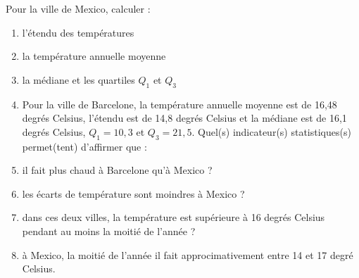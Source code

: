 \documentclass[french]{article}
\begin{document}
     Pour la ville de Mexico, calculer :
  
  \begin{enumerate}

  \item l'étendu des températures
  \item la température annuelle moyenne
  \item la médiane et les quartiles $Q_1$ et $Q_3$
\item[•]   Pour la ville de Barcelone, la température annuelle moyenne est de 16,48 degrés Celsius, l'étendu est de 14,8 degrés Celsius et la médiane est de 16,1 degrés Celsius, $Q_1=10,3$ et $Q_3=21,5$. Quel(s) indicateur(s) statistiques(s) permet(tent) d'affirmer que :
  \item il fait plus chaud à Barcelone qu'à Mexico ?
  \item les écarts de température sont moindres à Mexico ?
  \item dans ces deux villes, la température est supérieure à 16 degrés Celsius pendant au moins la moitié de l'année ?
  \item à Mexico, la moitié de l'année il fait approcimativement entre 14 et 17 degré Celsius.
  
  \end{enumerate}
\end{document}
